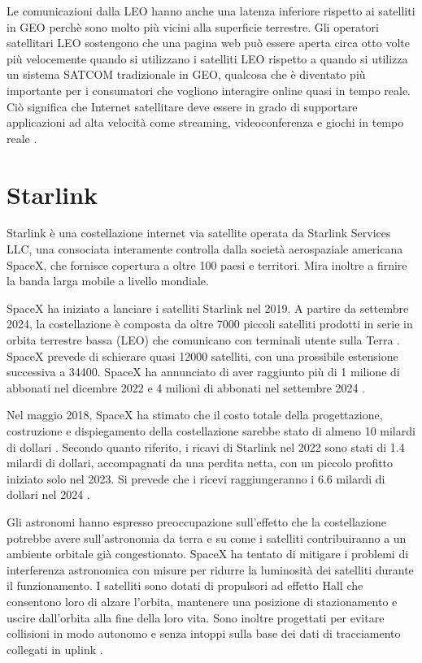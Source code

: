 Le comunicazioni dalla \ac{LEO} hanno anche una latenza inferiore rispetto ai satelliti in \ac{GEO} perchè sono molto più vicini alla superficie terrestre.
Gli operatori satellitari \ac{LEO} sostengono che una pagina web può essere aperta circa otto volte più velocemente quando si utilizzano i satelliti \ac{LEO} rispetto a quando si utilizza un sistema SATCOM tradizionale in \ac{GEO}, qualcosa che è diventato più importante per i consumatori che vogliono interagire online quasi in tempo reale.
Ciò significa che Internet satellitare deve essere in grado di supportare applicazioni ad alta velocità come streaming, videoconferenza e giochi in tempo reale \cite{makena_young_low_2022}.

\section{Starlink}

Starlink è una costellazione internet via satellite operata da Starlink Services LLC, una consociata interamente controlla dalla società aerospaziale americana SpaceX, che fornisce copertura a oltre 100 paesi e territori.
Mira inoltre a firnire la banda larga mobile a livello mondiale.

SpaceX ha iniziato a lanciare i satelliti Starlink nel 2019.
A partire da settembre 2024, la costellazione è composta da oltre 7000 piccoli satelliti prodotti in serie in orbita terrestre bassa (\ac{LEO}) che comunicano con terminali utente sulla Terra \cite{jonathan_mcdowell_starlink_nodate}.
SpaceX prevede di schierare quasi 12000 satelliti, con una prossibile estensione successiva a 34400.
SpaceX ha annunciato di aver raggiunto più di 1 milione di abbonati nel dicembre 2022 e 4 milioni di abbonati nel settembre 2024 \cite{starlink_starlink_nodate}.

Nel maggio 2018, SpaceX ha stimato che il costo totale della progettazione, costruzione e dispiegamento della costellazione sarebbe stato di almeno 10 milardi di dollari \cite{michael_baylor_block_2018}.
Secondo quanto riferito, i ricavi di Starlink nel 2022 sono stati di 1.4 milardi di dollari, accompagnati da una perdita netta, con un piccolo profitto iniziato solo nel 2023.
Si prevede che i ricevi raggiungeranno i 6.6 milardi di dollari nel 2024 \cite{eric_berger_analyst_2024}.

Gli astronomi hanno espresso preoccupazione sull'effetto che la costellazione potrebbe avere sull'astronomia da terra e su come i satelliti contribuiranno a un ambiente orbitale già congestionato.
SpaceX ha tentato di mitigare i problemi di interferenza astronomica con misure per ridurre la luminosità dei satelliti durante il funzionamento.
I satelliti sono dotati di propulsori ad effetto Hall che consentono loro di alzare l'orbita, mantenere una posizione di stazionamento e uscire dall'orbita alla fine della loro vita.
Sono inoltre progettati per evitare collisioni in modo autonomo e senza intoppi sulla base dei dati di tracciamento collegati in uplink \cite{spacex_astronomy_2020}.